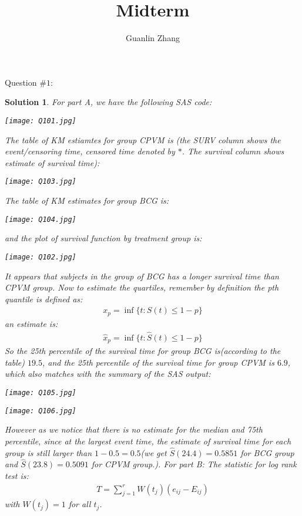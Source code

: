 \documentclass[11pt]{article}
\title{Midterm}
\author{Guanlin Zhang}
\newtheorem{sol}{Solution}
\begin{document}
Question $\# 1$:
\begin{sol}
	For part A, we have the following SAS code:
	\begin{center}
		\texttt{[image: Q101.jpg]}
	\end{center}
	The table of KM estiamtes for group CPVM is (the SURV column shows the event/censoring time, censored time denoted by $\ast$. The survival column shows estimate of survival time):
	\begin{center}
		\texttt{[image: Q103.jpg]}
	\end{center}
	The table of KM estimates for group BCG is:
	\begin{center}
		\texttt{[image: Q104.jpg]}
	\end{center}
	and the plot of survival function by treatment group is:
	\begin{center}
		\texttt{[image: Q102.jpg]}
	\end{center}
	It appears that subjects in the group of BCG has a longer survival time than CPVM group.\vskip 2mm
	Now to estimate the quartiles, remember by definition the pth quantile is defined as:
	\begin{align*}
		x_p = \inf\{t: S(t) \leq 1 - p\}
	\end{align*}
	an estimate is:
	\begin{align*}
		\hat{x}_p = \inf\{t: \hat{S}(t) \leq 1 - p\}
	\end{align*}
	So the 25th percentile of the survival time for group BCG is(according to the table) $19.5$, and the 25th percentile of the survival time for group CPVM is $6.9$, which also matches with the summary of the SAS output:
	\begin{center}
		\texttt{[image: Q105.jpg]}
	\end{center}
	\begin{center}
		\texttt{[image: Q106.jpg]}
	\end{center}
	However as we notice that there is no estimate for the median and 75th percentile, since at the largest event time, the estimate of survival time for each group is still larger than $1 - 0.5 = 0.5$(we get $\hat{S}(24.4) = 0.5851$ for BCG group and $\hat{S}(23.8) = 0.5091$ for CPVM group.).\vskip 2mm
	For part B:\vskip 2mm
	The statistic for log rank test is:
	\begin{align*}
		T = \sum_{j = 1}^{r}W(t_j)(e_{ij} - E_{ij})
	\end{align*}
	with $W(t_j) = 1$ for all $t_j$.\vskip 2mm

\end{sol}
\end{document}
